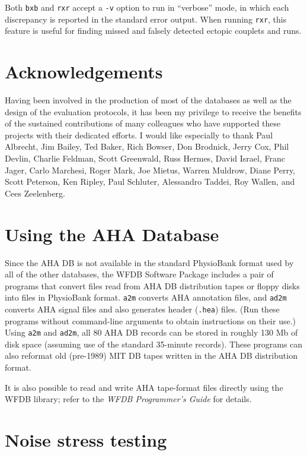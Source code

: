 \documentclass[twoside]{article}
\begin{document}
Both {\tt bxb} and {\tt rxr} accept a {\tt -v} option to run in
``verbose'' mode, in which each discrepancy is reported in the
standard error output.  When running {\tt rxr}, this feature is useful
for finding missed and falsely detected ectopic couplets and runs.

\section{Acknowledgements}

Having been involved in the production of most of the databases as
well as the design of the evaluation protocols, it has been my
privilege to receive the benefits of the sustained contributions of
many colleagues who have supported these projects with their dedicated
efforts.  I would like especially to thank
Paul Albrecht,
Jim Bailey,
Ted Baker,
Rich Bowser,
Don Brodnick,
Jerry Cox,
Phil Devlin,
Charlie Feldman,
Scott Greenwald,
Russ Hermes,
David Israel,
Franc Jager,
Carlo Marchesi,
Roger Mark,
Joe Mietus,
Warren Muldrow,
Diane Perry,
Scott Peterson,
Ken Ripley,
Paul Schluter,
Alessandro Taddei,
Roy Wallen,
and Cees Zeelenberg.

\appendix
\section{Using the AHA Database}

Since the AHA DB is not available in the standard PhysioBank format
used by all of the other databases, the WFDB Software Package includes
a pair of programs that convert files read from AHA DB distribution
tapes or floppy disks into files in PhysioBank format.  {\tt a2m}
converts AHA annotation files, and {\tt ad2m} converts AHA signal
files and also generates header ({\tt *.hea}) files.  (Run these
programs without command-line arguments to obtain instructions on
their use.)  Using {\tt a2m} and {\tt ad2m}, all 80 AHA DB records can
be stored in roughly 130 Mb of disk space (assuming use of the
standard 35-minute records).  These programs can also reformat old
(pre-1989) MIT DB tapes written in the AHA DB distribution format.

It is also possible to read and write AHA tape-format files directly using
the WFDB library;  refer to the {\it WFDB Programmer's Guide}
for details.

\section{Noise stress testing}
\end{document}
